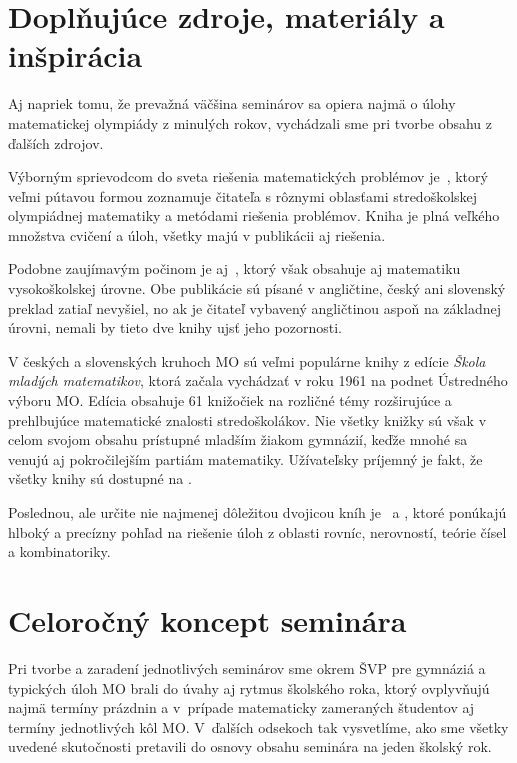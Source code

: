 \section{Doplňujúce zdroje, materiály a inšpirácia}

Aj napriek tomu, že prevažná väčšina seminárov sa opiera najmä o úlohy matematickej olympiády z minulých rokov, vychádzali sme pri tvorbe obsahu z ďalších zdrojov.

Výborným sprievodcom do sveta riešenia matematických problémov je~\cite{holton2010}, ktorý veľmi pútavou formou zoznamuje čitateľa s rôznymi oblasťami stredoškolskej olympiádnej matematiky a metódami riešenia problémov. Kniha je plná veľkého množstva cvičení a úloh, všetky majú v publikácii aj riešenia.

Podobne zaujímavým počinom je aj~\cite{zeitz2007}, ktorý však obsahuje aj matematiku vysokoškolskej úrovne. Obe publikácie sú písané v angličtine, český ani slovenský preklad zatiaľ nevyšiel, no ak je čitateľ vybavený angličtinou aspoň na základnej úrovni, nemali by tieto dve knihy ujsť jeho pozornosti.

V českých a slovenských kruhoch MO sú veľmi populárne knihy z edície \textit{Škola mladých matematikov}, ktorá začala vychádzať v roku 1961 na podnet Ústredného výboru MO. Edícia obsahuje 61 knižočiek na rozličné témy rozširujúce a prehlbujúce matematické znalosti stredoškolákov. Nie všetky knižky sú však v celom svojom obsahu prístupné mladším žiakom gymnázií, keďže mnohé sa venujú aj pokročilejším partiám matematiky. Užívateľsky príjemný je fakt, že všetky knihy sú dostupné na \cite{DMK}.

Poslednou, ale určite nie najmenej dôležitou dvojicou kníh je~\cite{herman2004} a \cite{herman2011}, ktoré ponúkajú hlboký a precízny pohľad na riešenie úloh z oblasti rovníc, nerovností, teórie čísel a kombinatoriky.



\section{Celoročný koncept seminára}

Pri tvorbe a zaradení jednotlivých seminárov sme okrem ŠVP pre gymnáziá a typických úloh MO brali do úvahy aj rytmus školského roka, ktorý ovplyvňujú najmä termíny prázdnin a v~prípade matematicky zameraných študentov aj termíny jednotlivých kôl MO. V~ďalších odsekoch tak vysvetlíme, ako sme všetky uvedené skutočnosti pretavili do osnovy obsahu seminára na jeden školský rok.

